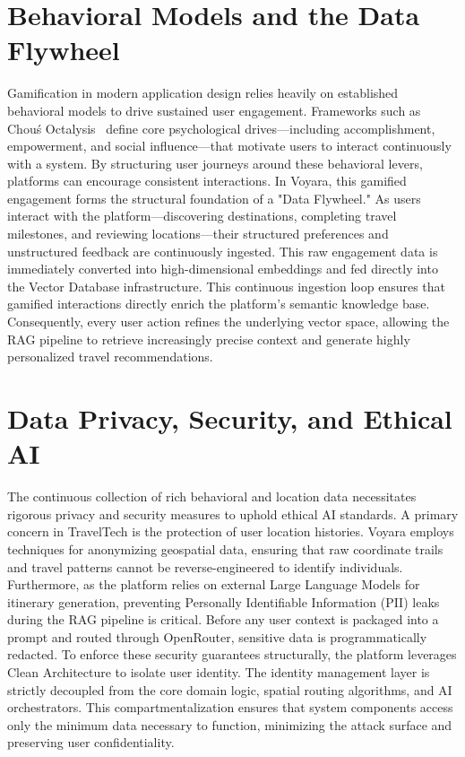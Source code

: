 \section{Behavioral Models and the Data Flywheel}
Gamification in modern application design relies heavily on established behavioral models to drive sustained user engagement. Frameworks such as Chou\'s Octalysis~\cite{chou2015actionable} define core psychological drives—including accomplishment, empowerment, and social influence—that motivate users to interact continuously with a system. By structuring user journeys around these behavioral levers, platforms can encourage consistent interactions. In Voyara, this gamified engagement forms the structural foundation of a "Data Flywheel." As users interact with the platform—discovering destinations, completing travel milestones, and reviewing locations—their structured preferences and unstructured feedback are continuously ingested. This raw engagement data is immediately converted into high-dimensional embeddings and fed directly into the Vector Database infrastructure. This continuous ingestion loop ensures that gamified interactions directly enrich the platform's semantic knowledge base. Consequently, every user action refines the underlying vector space, allowing the RAG pipeline to retrieve increasingly precise context and generate highly personalized travel recommendations.

\section{Data Privacy, Security, and Ethical AI}
The continuous collection of rich behavioral and location data necessitates rigorous privacy and security measures to uphold ethical AI standards. A primary concern in TravelTech is the protection of user location histories. Voyara employs techniques for anonymizing geospatial data, ensuring that raw coordinate trails and travel patterns cannot be reverse-engineered to identify individuals. Furthermore, as the platform relies on external Large Language Models for itinerary generation, preventing Personally Identifiable Information (PII) leaks during the RAG pipeline is critical. Before any user context is packaged into a prompt and routed through OpenRouter, sensitive data is programmatically redacted. To enforce these security guarantees structurally, the platform leverages Clean Architecture to isolate user identity. The identity management layer is strictly decoupled from the core domain logic, spatial routing algorithms, and AI orchestrators. This compartmentalization ensures that system components access only the minimum data necessary to function, minimizing the attack surface and preserving user confidentiality.

